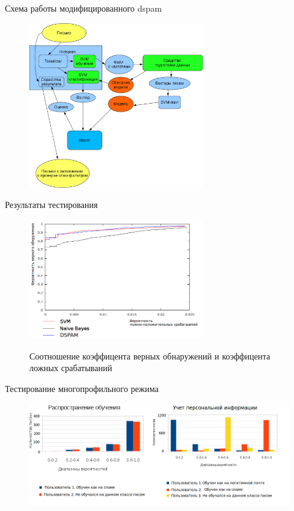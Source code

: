 \documentclass{beamer}
\begin{document}
\begin{frame}{Схема работы модифицированного dspam}
\begin{figure}[h]
\begin{center}
    \includegraphics[width=7.5cm]{../img/working_scheme2}
\end{center}
\end{figure}
\end{frame}

\begin{frame}{Результаты тестирования}
\begin{figure}[h]
\begin{center}
    \includegraphics[width=7.5cm]{../img/graphic}
\end{center}
    Соотношение коэффицента верных обнаружений и коэффицента ложных срабатываний
\end{figure}

\end{frame}

\begin{frame}{Тестирование многопрофильного режима}
\begin{figure}[h]
\begin{center}
	\includegraphics[width=12cm]{img/experiment2}
\end{center}
\end{figure}
\end{frame}
\end{document}
